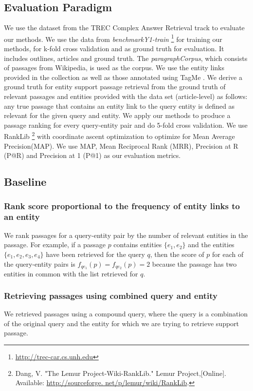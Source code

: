 \documentclass[sigconf,anonymous,review]{acmart}
\begin{document}
\subsection{Evaluation Paradigm}
\label{subsec:Evaluation Paradigm}
We use the dataset from the TREC Complex Answer Retrieval track \cite{dietztrec} to evaluate our methods. We use the data from \textit{benchmarkY1-train}
\footnote{\url{http://trec-car.cs.unh.edu}} for training our methods, for k-fold cross validation and as ground truth for evaluation. It includes outlines, articles and ground truth. 
The \textit{paragraphCorpus}, which consists of passages from Wikipedia, is used as the corpus. We use the entity links provided in the collection as well as those annotated using TagMe \cite{ferragina2010tagme}. We derive a ground truth for entity support passage retrieval from the ground truth of relevant passages and entities provided with the data set (article-level) as follows: any true passage that contains an entity link to the query entity is defined as relevant for the given query and entity. We apply our methods to produce a passage ranking for every query-entity pair and do 5-fold cross validation. We use RankLib \footnote{Dang, V. "The Lemur Project-Wiki-RankLib." Lemur Project,[Online]. Available: \url{http://sourceforge. net/p/lemur/wiki/RankLib}.} with coordinate ascent optimization to optimize for Mean Average Precision(MAP). We use MAP, Mean Reciprocal Rank (MRR), Precision at R (P@R) and Precision at 1 (P@1) as our evaluation metrics.  
\subsection{Baseline}
\label{subsec:Baseline}
\subsubsection{Rank score proportional to the frequency of entity links to an entity} 
\label{subsubsec: baseline 1}
We rank passages for a query-entity pair by the number of relevant entities in the passage. For example, if a passage $p$ contains entities $\{e_1,e_2\}$ and the entities $\{e_1,e_2,e_3,e_4\}$ have been retrieved for the query $q$, then the score of $p$ for each of the query-entity pairs is $f_{qe_1}(p)=f_{qe_2}(p)=2$ because the passage has two entities in common with the list retrieved for $q$.

\subsubsection{Retrieving passages using combined query and entity} 
\label{subsubsec: baseline 2}
We retrieved passages using a compound query, where the query is a combination of the original query and the entity for which we are trying to retrieve support passage.
 
\end{document}
